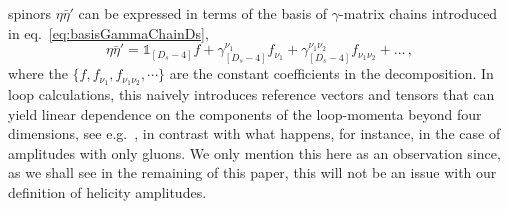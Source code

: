spinors $\eta \bar \eta'$ can  be expressed in terms of the 
basis of $\gamma$-matrix chains introduced in 
eq.~\eqref{eq:basisGammaChainDs},
%
\begin{equation}\label{eq:etaetaP}
\eta \bar \eta' = \mathbb{1}_{[D_s-4]} f +  
\gamma_{[D_s-4]}^{\nu_1} f_{\nu_1} + 
\gamma_{[D_s-4]}^{\nu_1\nu_2} f_{\nu_1\nu_2} + \ldots \,,
\end{equation}
%
where the $\{ f , f_{\nu_1}, f_{\nu_1\nu_2},\cdots \}$ are the
constant coefficients in the decomposition.
In loop calculations, this naively introduces reference vectors and tensors that can yield linear
dependence on the components of the loop-momenta beyond four
dimensions, see e.g.~\cite{Badger:2017gta,Anger:2018ove},
in contrast with
what happens, for instance, in the case of amplitudes with
only gluons.
We only mention this here as an observation since, as we 
shall see in the remaining of this paper, this will not be an
issue with our definition of helicity amplitudes.

